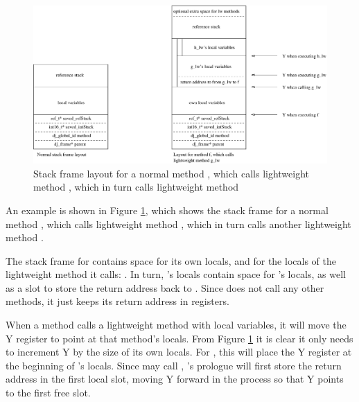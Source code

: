 
\begin{figure}
\centering
\includegraphics[width=0.95\linewidth]{stack-frame-lightweight-method.eps}
\caption{Stack frame layout for a normal method , which calls lightweight method , which in turn calls lightweight method }
\label{fig-stack-frame-lightweight-method}
\end{figure}

An example is shown in Figure \ref{fig-stack-frame-lightweight-method}, which shows the stack frame for a normal method , which calls lightweight method , which in turn calls another lightweight method .

The stack frame for  contains space for its own locals, and for the locals of the lightweight method it calls: . In turn, 's locals contain space for 's locals, as well as a slot to store the return address back to . Since  does not call any other methods, it just keeps its return address in registers.

When a method calls a lightweight method with local variables, it will move the Y register to point at that method's locals. From Figure \ref{fig-stack-frame-lightweight-method} it is clear it only needs to increment Y by the size of its own locals. For , this will place the Y register at the beginning of 's locals. Since  may call , 's prologue will first store the return address in the first local slot, moving Y forward in the process so that Y points to the first free slot.

